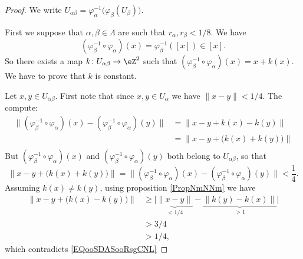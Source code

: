 \begin{proof}
	We write \( U_{\alpha\beta}=\varphi_{\alpha}^{-1}\big( \varphi_{\beta}(U_{\beta}) \big)\).

	First we suppose that \( \alpha,\beta\in \Lambda\) are such that \( r_{\alpha},r_{\beta}<1/8\). We have
	\begin{equation}
		(\varphi_{\beta}^{-1}\circ \varphi_{\alpha})(x)=\varphi_{\beta}^{-1}([x])\in[x].
	\end{equation}
	So there exists a map \(k \colon U_{\alpha\beta}\to \eZ^2  \) such that \( (\varphi_{\beta}^{-1}\circ\varphi_{\alpha})(x)=x+k(x)\). We have to prove that \( k\) is constant.

	Let \( x,y\in U_{\alpha\beta}\). First note that since \( x,y\in U_{\alpha}\) we have \( \| x-y \|<1/4\). The compute:
	\begin{subequations}
		\begin{align}
			\| (\varphi_{\beta}^{-1}\circ\varphi_{\alpha})(x)-(\varphi_{\beta}^{-1}\circ \varphi_{\alpha})(y) \| & =\| x-y+k(x)-k(y) \|             \\
			                                                                                                     & =\| x-y+\big( k(x)+k(y) \big) \| \\
		\end{align}
	\end{subequations}
	But \( (\varphi_{\beta}^{-1}\circ\varphi_{\alpha})(x)\) and \( (\varphi_{\beta}^{-1}\circ \varphi_{\alpha})(y)\) both belong to \( U_{\alpha\beta}\), so that
	\begin{equation}		\label{EQooSDASooRsgCNL}
		\| x-y+\big( k(x)+k(y) \big) \|= \| (\varphi_{\beta}^{-1}\circ\varphi_{\alpha})(x)-(\varphi_{\beta}^{-1}\circ \varphi_{\alpha})(y) \|<\frac{1}{ 4}.
	\end{equation}
	Assuming \( k(x)\neq k(y)\), using proposition \ref{PropNmNNm} we have
	\begin{subequations}
		\begin{align}
			\| x-y+\big( k(x)-k(y) \big) \| & \geq \big| \underbrace{\| x-y \|}_{<1/4}-\underbrace{\| k(y)-k(x) \|}_{>1} \big| \\
			                                & >3/4                                                                             \\
			                                & >1/4,
		\end{align}
	\end{subequations}
	which contradicts \eqref{EQooSDASooRsgCNL}
\end{proof}



